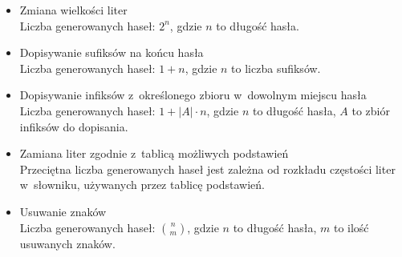 \begin{itemize}

    \item
        Zmiana wielkości liter \\
        Liczba generowanych haseł: $2^n$, gdzie $n$ to długość hasła.

        

        

    \item
        Dopisywanie sufiksów na końcu hasła \\
        Liczba generowanych haseł: $1+n$, gdzie $n$ to liczba sufiksów.

        

        

    \item
        Dopisywanie infiksów z~określonego zbioru w~dowolnym miejscu hasła \\
        Liczba generowanych haseł: $1 + |A| \cdot n$, gdzie $n$ to długość
        hasła, $A$ to zbiór infiksów do dopisania.

        

        

    \item
        Zamiana liter zgodnie z~tablicą możliwych podstawień \\
        Przeciętna liczba generowanych haseł jest zależna od rozkładu częstości
        liter w~słowniku, używanych przez tablicę podstawień.

        

        

    \item
        Usuwanie znaków \\
        Liczba generowanych haseł: $n \choose m$, gdzie $n$ to długość hasła,
        $m$ to ilość usuwanych znaków.


\end{itemize}
